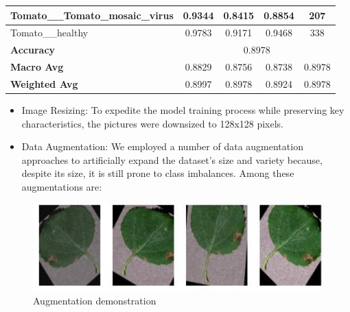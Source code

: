\documentclass[conference]{IEEEtran}
\begin{document}
\begin{table}[ht]
\begin{adjustbox}{max width=\textwidth}
\begin{tabular}{|p{4.5cm}|c|c|c|c|}
        \hline
        Tomato\_\_Tomato\_mosaic\_virus & 0.9344 & 0.8415 & 0.8854 & 207 \\
        \hline
        Tomato\_\_healthy & 0.9783 & 0.9171 & 0.9468 & 338 \\
        \hline
        \textbf{Accuracy} & \multicolumn{4}{c|}{0.8978} \\
        \hline
        \textbf{Macro Avg} & 0.8829 & 0.8756 & 0.8738 & 0.8978 \\
        \hline
        \textbf{Weighted Avg} & 0.8997 & 0.8978 & 0.8924 & 0.8978 \\
        \hline
    \end{tabular}
    \end{adjustbox}
    
    \label{tab:metrics}
\end{table}


\begin{itemize}
    \item Image Resizing: To expedite the model training process while preserving key characteristics, the pictures were downsized to 128x128 pixels.
\end{itemize}
\begin{itemize}
    \item Data Augmentation: We employed a number of data augmentation approaches to artificially expand the dataset's size and variety because, despite its size, it is still prone to class imbalances. Among these augmentations are:
\end{itemize}
\begin{figure}
    \centering
    \includegraphics[width=1.0\linewidth]{smp1.jpg}
    \caption{Augmentation demonstration}
    \label{fig:enter-label}
\end{figure}
\end{document}
